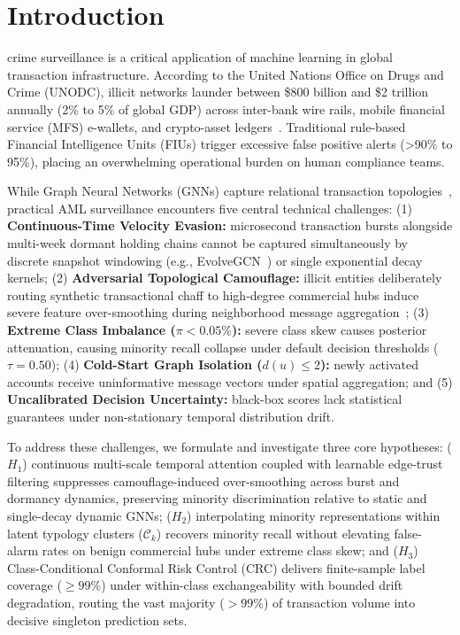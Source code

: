 \section{Introduction}
 crime surveillance is a critical application of machine learning in global transaction infrastructure. According to the United Nations Office on Drugs and Crime (UNODC), illicit networks launder between \$800 billion and \$2 trillion annually (2\% to 5\% of global GDP) across inter-bank wire rails, mobile financial service (MFS) e-wallets, and crypto-asset ledgers~\cite{unodc2011illicit}. Traditional rule-based Financial Intelligence Units (FIUs) trigger excessive false positive alerts (>90\% to 95\%), placing an overwhelming operational burden on human compliance teams.

While Graph Neural Networks (GNNs) capture relational transaction topologies~\cite{hu2020heterogeneous, kipf2017semi, hamilton2017inductive, weber2019anti}, practical AML surveillance encounters five central technical challenges: 
(1) \textbf{Continuous-Time Velocity Evasion:} microsecond transaction bursts alongside multi-week dormant holding chains cannot be captured simultaneously by discrete snapshot windowing (e.g., EvolveGCN~\cite{pareja2020evolvegcn}) or single exponential decay kernels; 
(2) \textbf{Adversarial Topological Camouflage:} illicit entities deliberately routing synthetic transactional chaff to high-degree commercial hubs induce severe feature over-smoothing during neighborhood message aggregation~\cite{dou2020enhancing}; 
(3) \textbf{Extreme Class Imbalance ($\pi < 0.05\%$):} severe class skew causes posterior attenuation, causing minority recall collapse under default decision thresholds ($\tau=0.50$); 
(4) \textbf{Cold-Start Graph Isolation ($d(u) \le 2$):} newly activated accounts receive uninformative message vectors under spatial aggregation; and 
(5) \textbf{Uncalibrated Decision Uncertainty:} black-box scores lack statistical guarantees under non-stationary temporal distribution drift.

To address these challenges, we formulate and investigate three core hypotheses: 
($H_1$) continuous multi-scale temporal attention coupled with learnable edge-trust filtering suppresses camouflage-induced over-smoothing across burst and dormancy dynamics, preserving minority discrimination relative to static and single-decay dynamic GNNs; 
($H_2$) interpolating minority representations within latent typology clusters ($\mathcal{C}_k$) recovers minority recall without elevating false-alarm rates on benign commercial hubs under extreme class skew; and 
($H_3$) Class-Conditional Conformal Risk Control (CRC) delivers finite-sample label coverage ($\ge 99\%$) under within-class exchangeability with bounded drift degradation, routing the vast majority ($>99\%$) of transaction volume into decisive singleton prediction sets.

